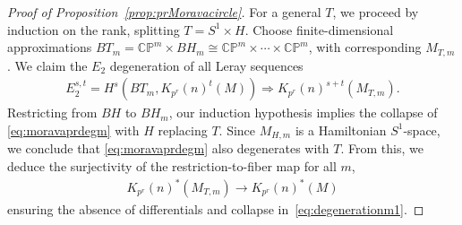 \documentclass[10pt,a4paper]{amsart}
\begin{document}
\begin{proof}[Proof of Proposition~\ref{prop:prMoravacircle}]
For a general $T$, we proceed by induction on the rank, splitting  $T=S^1 \times H$. 
Choose  finite-dimensional approximations 
$BT_m =  \mathbb{CP}^m\times BH_m\cong \mathbb{CP}^m \times \cdots \times \mathbb{CP}^m$, 
with corresponding $M_{T,m}$. We claim  the $E_2$ degeneration of all Leray sequences  
\begin{align} \label{eq:moravaprdegm} 
E_2^{s,t}= H^s(BT_m, K_{p^r}(n)^t(M)) \Rightarrow K_{p^r}(n)^{s+t}(M_{T,m}).
\end{align} 
Restricting from $BH$ to $BH_m$, our induction hypothesis implies the collapse of \eqref{eq:moravaprdegm} with $H$ replacing $T$.  Since $M_{H,m}$ is a Hamiltonian $S^1$-space, 
we conclude that \eqref{eq:moravaprdegm} also degenerates with $T$.  
From this,  we deduce the surjectivity of the restriction-to-fiber map for all 
$m$, 
\begin{align} \label{eq:degenerationmorava} 
K_{p^r}(n)^*(M_{T,m}) \to K_{p^r}(n)^*(M)
\end{align} 
ensuring the absence of differentials and collapse in~\eqref{eq:degenerationm1}. 
\end{proof} 
\end{document}
